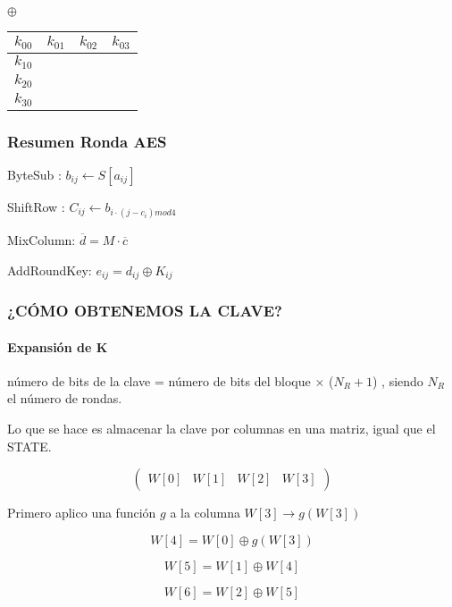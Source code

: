 \begin{itemize}
\begin{center}
\begin{tabular}{l | c | r | r}
	\end{tabular} $\oplus$
	
	\begin{tabular}{l | c | r | r}
		$k_{00}$ & $k_{01}$ & $k_{02}$ & $k_{03}$\\
		\hline
		$k_{10}$ &   &   &  \\
		\hline
		$k_{20}$ &   &   & \\
		\hline
		$k_{30}$ &   &   & 
		
	\end{tabular}

\end{center}

		
\end{itemize}


\subsubsection{Resumen Ronda AES}

ByteSub : $b_{ij} \leftarrow S[a_{ij}]$

ShiftRow : $C_{ij} \leftarrow b_{i\cdot(j-c_i) mod 4}$

MixColumn: $\overline{d} = M\cdot \overline{c}$

AddRoundKey: $e_{ij} = d_{ij} \oplus K_{ij}$


\subsubsection{¿CÓMO OBTENEMOS LA CLAVE?}


	\paragraph{ Expansión de K}
	
	 número de bits de la clave = número de bits del bloque $\times$ ($N_R +1$) , siendo $N_R$ el número de rondas.
	
	Lo que se hace es almacenar la clave por columnas en una matriz, igual que el STATE.
	
	$$\left(\begin{matrix}
	W[0] & W[1] & W[2] & W[3]
	\end{matrix}\right)$$
	
	Primero aplico una función $g$ a la columna $W[3] \rightarrow g(W[3])$
	
	$$W[4] = W[0] \oplus g(W[3])$$
	
	$$W[5] = W[1] \oplus W[4]$$
	
	$$W[6] = W[2] \oplus W[5]$$
	
